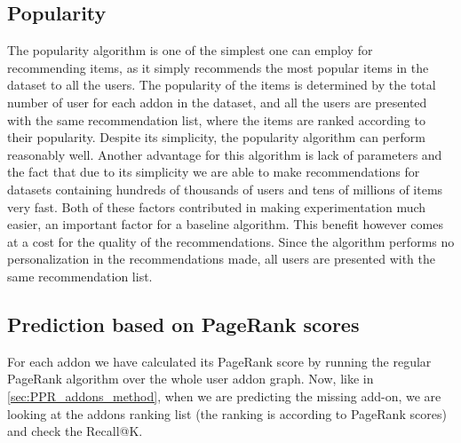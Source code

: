 \documentclass[11pt,oneside]{book}
\let\Oldsubsection\subsection
\renewcommand{\subsection}{\FloatBarrier\Oldsubsection}
\begin{document}
\subsection{Popularity}
The popularity algorithm is one of the simplest one can employ for recommending items, as it simply recommends the most popular items in the dataset to all the users. The popularity of the items is determined by the total number of user for each addon in the dataset, and all the users are presented with the same recommendation list, where the items are ranked according to their popularity. Despite its
simplicity, the popularity algorithm can perform reasonably well.
Another advantage for this algorithm is lack of parameters and the fact that due to its simplicity we are able to make recommendations for datasets containing hundreds of thousands of users and tens of millions of items very fast. Both of these factors contributed in making experimentation much easier, an important factor for a baseline algorithm.
This benefit however comes at a cost for the quality of the recommendations. Since the algorithm performs no personalization in the recommendations made, all users are presented with the same recommendation list.
\subsection{Prediction based on PageRank scores}
For each addon we have calculated its PageRank score by running the regular PageRank algorithm over the whole user addon graph. Now, like in \autoref{sec:PPR_addons_method}, when we are predicting the missing add-on, we are looking at the addons ranking list (the ranking is according to PageRank scores) and check the Recall@K.
\end{document}
